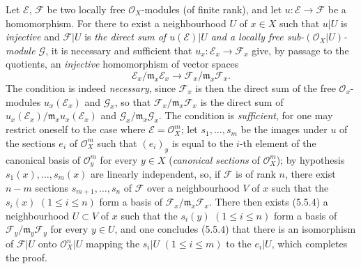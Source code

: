 \begin{env}[5.5.5]
\label{0.5.5.5}
Let $\mathcal{E}$, $\mathcal{F}$ be two locally free $\mathcal{O}_X$-modules
(of finite rank), and let $u:\mathcal{E}\to\mathcal{F}$ be a
homomorphism. For there to exist a neighbourhood $U$ of $x\in X$ such that $u|U$
is \emph{injective} and $\mathcal{F}|U$ is \emph{the direct sum of
$u(\mathcal{E})|U$ and a locally free sub-$(\mathcal{O}_X|U)$-module
$\mathcal{G}$}, it is necessary and sufficient that
$u_x:\mathcal{E}_x\to\mathcal{F}_x$ give, by passage to the quotients, an
\emph{injective} homomorphism of vector spaces
\[
  \mathcal{E}_x/\mathfrak{m}_x\mathcal{E}_x
  \longrightarrow
  \mathcal{F}_x/\mathfrak{m}_x\mathcal{F}_x.
\]
The condition is indeed \emph{necessary}, since $\mathcal{F}_x$ is then
the direct sum of the free $\mathcal{O}_x$-modules $u_x(\mathcal{E}_x)$ and
$\mathcal{G}_x$, so that $\mathcal{F}_x/\mathfrak{m}_x\mathcal{F}_x$ is the
direct sum of
$u_x(\mathcal{E}_x)/\mathfrak{m}_x u_x(\mathcal{E}_x)$ and
$\mathcal{G}_x/\mathfrak{m}_x\mathcal{G}_x$. The condition is
\emph{sufficient}, for one may restrict oneself to the case where
$\mathcal{E}=\mathcal{O}_X^m$; let $s_1,\ldots,s_m$ be the images under $u$ of the
sections $e_i$ of $\mathcal{O}_X^m$ such that $(e_i)_y$ is equal to the $i$-th
element of the canonical basis of $\mathcal{O}_y^m$ for every $y\in X$
(\emph{canonical sections} of $\mathcal{O}_X^m$); by hypothesis
$s_1(x),\ldots,s_m(x)$ are linearly independent, so, if $\mathcal{F}$
is of rank $n$, there exist $n-m$ sections $s_{m+1},\ldots,s_n$ of
$\mathcal{F}$ over a neighbourhood $V$ of $x$ such that the $s_i(x)$
$(1\leq i\leq n)$ form a basis of
$\mathcal{F}_x/\mathfrak{m}_x\mathcal{F}_x$. There then exists (5.5.4) a
neighbourhood $U\subset V$ of $x$ such that the $s_i(y)$ $(1\leq i\leq n)$ form
a basis of $\mathcal{F}_y/\mathfrak{m}_y\mathcal{F}_y$ for every $y\in U$,
and one concludes (5.5.4) that there is an isomorphism of $\mathcal{F}|U$ onto
$\mathcal{O}_X^n|U$ mapping the $s_i|U$ $(1\leq i\leq m)$ to the
$e_i|U$, which completes the proof.
\end{env}

